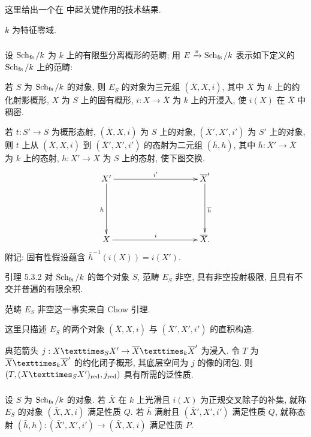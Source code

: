 这里给出一个在 \cite{sga4.exp.Vbis.bib.2} 中起关键作用的技术结果.

$k$ 为特征零域.

\subsubsection{}
设 $\operatorname{Sch}_{\operatorname{fs}} /k$ 为 $k$ 上的有限型分离概形的范畴;
用 $E \xrightarrow{\pi} \operatorname{Sch}_{\operatorname{fs}}/k$ 表示如下定义的 $\operatorname{Sch}_{\operatorname{fs}}/k$ 上的范畴:

\noindent \sisi{$+$}{} 若\pageoriginale{} $S$ 为 $\operatorname{Sch}_{\operatorname{fs}} /k$ 的对象,
则 $E_S$ 的对象为三元组 $(\bar{X}, X, i)$,
其中 $\bar{X}$ 为 $k$ 上的约化射影概形,
$X$ 为 $S$ 上的固有概形, $i : X \to \bar{X}$ 为 $k$ 上的开浸入,
使 $i(X)$ 在 $\bar{X}$ 中稠密.

\noindent \sisi{$+$}{} 若 $t : S' \to S$ 为概形态射,
$(\bar{X}, X, i)$ 为 $S$ 上的对象,
$(\bar{X}', X', i')$ 为 $S'$ 上的对象,
则 $t$ 上从 $(\bar{X}, X, i)$ 到 $(\bar{X}', X', i')$ 的态射为二元组 $(\bar{h}, h)$,
其中 $\bar{h} : \bar{X}'\to \bar{X}$ 为 $k$ 上的态射,
$h : X'\to X$ 为 $S$ 上的态射, 使下图交换.
\[
\xymatrix@C=3.5cm@R=2cm{
X' \ar[r]^{i'} \ar[d]_{h}& \bar{X}'\ar[d]^{\bar{h}}\\
X  \ar[r]^{i}& \bar{X}.
}
\]
附记: 固有性假设蕴含 $\bar{h}^{-1}(i(X)) = i(X')$.

\begin{enonce*}{引理 5.3.2}
对 $\operatorname{Sch}_{\operatorname{fs}} / k$ 的每个对象 $S$, 范畴 $E_S$ 非空,
具有非空投射极限, 且具有不交并普遍的有限余积.
\end{enonce*}

范畴 $E_S$ 非空这一事实来自 Chow 引理.

这里只描述 $E_S$ 的两个对象 $(\bar{X}, X, i)$ 与 $(\bar{X}', X', i')$ 的直积构造.

典范箭头 $j : \fprod{X}{X'}{S} \to\fprod{\bar{X}}{\bar{X}'}{k}$ 为浸入.
令 $T$ 为 $\fprod{\bar{X}}{\bar{X}'}{k}$ 的约化闭子概形,
其底层空间为 $j$ 的像的闭包.
则 $(T, (\fprod{X}{X'}{S})_{\red}, j_{\red})$ 具有所需的泛性质.

\setcounter{subsubsection}{2}
\subsubsection{}
设\pageoriginale{} $S$ 为 $\operatorname{Sch}_{\operatorname{fs}} /k$ 的对象.
若 $\bar{X}$ 在 $k$ 上光滑且 $i(X)$ 为正规交叉除子的补集,
就称 $E_S$ 的对象 $(\bar{X}, X, i)$ 满足性质 $Q$.
若 $\bar{h}$ 满射且 $(\bar{X}', X', i')$ 满足性质 $Q$,
就称态射 $(\bar{h}, h) : (\bar{X}', X', i') \to (\bar{X}, X, i)$ 满足性质 $P$.

